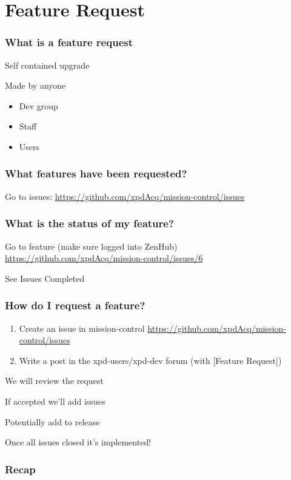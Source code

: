 \documentclass{beamer}
\begin{document}
\section{Feature Request}
\begin{frame}
    \frametitle{What is a feature request}
    Self contained upgrade
    \pause

    Made by anyone
    \begin{itemize}
        \item Dev group
        \item Staff
        \item Users
    \end{itemize}
\end{frame}

\begin{frame}
    \frametitle{What features have been requested?}
    Go to issues: \url{https://github.com/xpdAcq/mission-control/issues}
\end{frame}

\begin{frame}
    \frametitle{What is the status of my feature?}
    Go to feature (make sure logged into ZenHub)
    \url{https://github.com/xpdAcq/mission-control/issues/6}

    See Issues Completed
\end{frame}

\begin{frame}
    \frametitle{How do I request a feature?}
    \begin{enumerate}
        \pause
        \item Create an issue in mission-control
        \url{https://github.com/xpdAcq/mission-control/issues}
        \pause
        \item Write a post in the xpd-users/xpd-dev forum
        (with [Feature Request])
    \end{enumerate}

    \pause
    We will review the request

    \pause
    If accepted we'll add issues

    \pause
    Potentially add to release

    \pause
    Once all issues closed it's implemented!
\end{frame}
\begin{frame}
\frametitle{Recap}
\end{frame}
\end{document}
